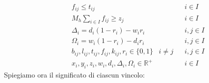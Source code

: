 \begin{align}
	  &             &   & f_{ij} \leq t_{ij}                                                           &          &   & i \in I \label{equa67}   \\
	  &             &   & M_h \sum_{i \in I} f_{ij} \geq z_j                                           &          &   & i \in I \label{equa68}   \\
	  &             &   & \Delta_i = d_i (1 - r_i) - w_i r_i                                           &          &   & i,j \in I \label{equa69} \\
	  &             &   & \Omega_i = w_i (1 - r_i) - d_i r_i                                           &          &   & i,j \in I \label{equa70} \\  
	  &             &   & b_{ij}, l_{ij}, t_{ij}, f_{ij}, k_{ij}, r_i \in \{0,1\}                      & i \neq j &   & i,j \in I \label{equa71} \\
	  &             &   & x_{i}, y_{i}, z_{i}, w_{i}, d_{i}, \Delta_{i}, \Omega_{i} \in \mathbb{R}^{+} &          &   & i \in I  \label{equa72}  
\end{align}
\newpage
Spiegiamo ora il significato di ciascun vincolo:
